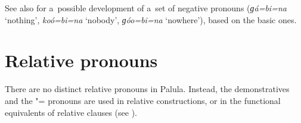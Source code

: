 See also  for a~possible development of a~set of negative  pronouns (\textit{ɡá=bi=na} `nothing', \textit{koó=bi=na} `nobody', \textit{ɡóo=bi=na} `nowhere'), based on the basic  ones.

\section{Relative pronouns}
\label{sec:5-8}

\largerpage

There are no distinct relative pronouns in Palula. Instead, the demonstratives and the "= pronouns are used in relative constructions, or in the functional equivalents of relative clauses (see ).